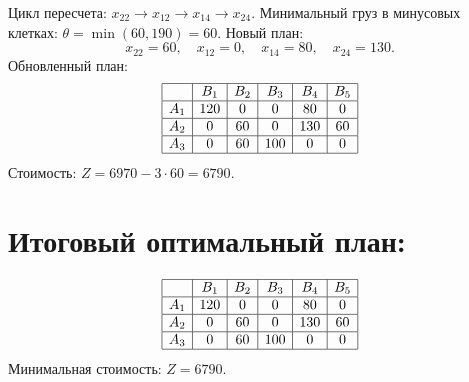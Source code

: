 \documentclass{article}
\begin{document}
Цикл пересчета:  
\( x_{22} \rightarrow x_{12} \rightarrow x_{14} \rightarrow x_{24} \).  
Минимальный груз в минусовых клетках: \( \theta = \min(60, 190) = 60 \).  
Новый план:  
\[
x_{22} = 60, \quad x_{12} = 0, \quad x_{14} = 80, \quad x_{24} = 130.
\]  
Обновленный план:  
\[
\begin{array}{|c|c|c|c|c|c|}
\hline
 & B_1 & B_2 & B_3 & B_4 & B_5 \\
\hline
A_1 & 120 & 0 & 0 & 80 & 0 \\
\hline
A_2 & 0 & 60 & 0 & 130 & 60 \\
\hline
A_3 & 0 & 60 & 100 & 0 & 0 \\
\hline
\end{array}
\]  
Стоимость: \( Z = 6970 - 3 \cdot 60 = 6790 \).  


\section{Итоговый оптимальный план:}

\[
\begin{array}{|c|c|c|c|c|c|}
\hline
 & B_1 & B_2 & B_3 & B_4 & B_5 \\
\hline
A_1 & 120 & 0 & 0 & 80 & 0 \\
\hline
A_2 & 0 & 60 & 0 & 130 & 60 \\
\hline
A_3 & 0 & 60 & 100 & 0 & 0 \\
\hline
\end{array}
\]  
Минимальная стоимость: \( Z = 6790 \).
\end{document}
